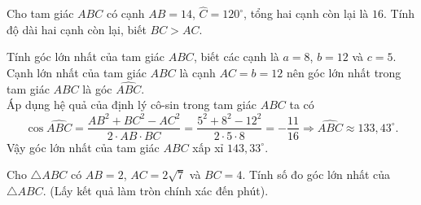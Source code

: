 \begin{bt}%
Cho tam giác $ABC$ có cạnh $AB=14$, $\widehat{C}=120^{\circ}$, tổng hai cạnh còn lại là $16$. Tính độ dài hai cạnh còn lại, biết $BC>AC$.
\end{bt}

\begin{bt}%
Tính góc lớn nhất của tam giác $ABC$, biết các cạnh là $a=8$, $b=12$ và $c=5$.
\loigiai
{Cạnh lớn nhất của tam giác $ABC$ là cạnh $AC=b=12$ nên góc lớn nhất trong tam giác $ABC$ là góc $\widehat{ABC}$.\\
Áp dụng hệ quả của định lý cô-sin trong tam giác $ABC$ ta có
\[\cos\widehat{ABC}=\dfrac{AB^2+BC^2-AC^2}{2\cdot AB\cdot BC}=\dfrac{5^2+8^2-12^2}{2\cdot5\cdot8}=-\dfrac{11}{16}\Rightarrow\widehat{ABC}\approx133{,}43^{\circ}.\]
Vậy góc lớn nhất của tam giác $ ABC $ xấp xỉ $143{,}33^{\circ}$.
}
\end{bt}

\begin{bt}%
Cho $\triangle ABC$ có $AB=2$, $AC=2 \sqrt{7}$ và $BC=4$. Tính số đo góc lớn nhất của $\triangle A B C$. (Lấy kết quả làm tròn chính xác đến phút).
\end{bt}

